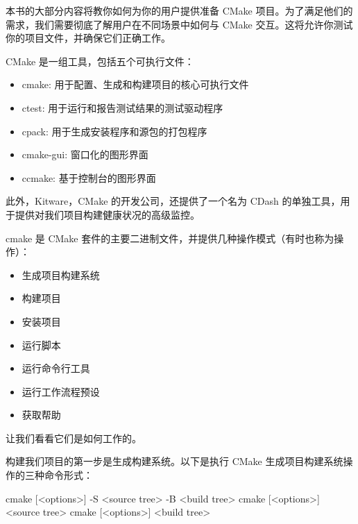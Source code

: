 本书的大部分内容将教你如何为你的用户提供准备 CMake 项目。为了满足他们的需求，我们需要彻底了解用户在不同场景中如何与 CMake 交互。这将允许你测试你的项目文件，并确保它们正确工作。

CMake 是一组工具，包括五个可执行文件：

\begin{itemize}
\item
cmake: 用于配置、生成和构建项目的核心可执行文件

\item
ctest: 用于运行和报告测试结果的测试驱动程序

\item
cpack: 用于生成安装程序和源包的打包程序

\item
cmake-gui: 窗口化的图形界面

\item
ccmake: 基于控制台的图形界面
\end{itemize}

此外，Kitware，CMake 的开发公司，还提供了一个名为 CDash 的单独工具，用于提供对我们项目构建健康状况的高级监控。


cmake 是 CMake 套件的主要二进制文件，并提供几种操作模式（有时也称为操作）：

\begin{itemize}
\item
生成项目构建系统

\item
构建项目

\item
安装项目

\item
运行脚本

\item
运行命令行工具

\item
运行工作流程预设

\item
获取帮助
\end{itemize}

让我们看看它们是如何工作的。


构建我们项目的第一步是生成构建系统。以下是执行 CMake 生成项目构建系统操作的三种命令形式：

\begin{shell}
cmake [<options>] -S <source tree> -B <build tree>
cmake [<options>] <source tree>
cmake [<options>] <build tree>
\end{shell}

